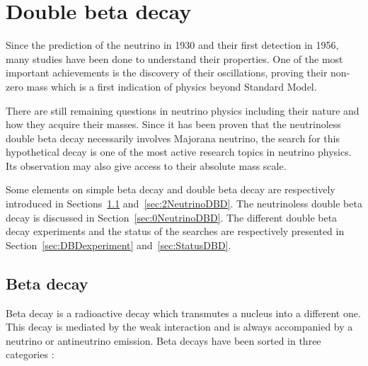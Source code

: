 \documentclass[main.tex]{subfiles}
\begin{document}
\chapter{Double beta decay}
 



\NI Since the prediction of the neutrino in 1930 and their first detection in 1956, many studies have been done to understand their properties. One of the most important achievements is the discovery of their oscillations, proving their non-zero mass which is a first indication of physics beyond Standard Model. 


\bigskip


\NI There are still remaining questions in neutrino physics including their nature and how they acquire their masses. Since it has been proven that the neutrinoless double beta decay necessarily involves Majorana neutrino, the search for this hypothetical decay is one of the most active research topics in neutrino physics. Its observation may also give access to their absolute mass scale.


\bigskip


\NI Some elements on simple beta decay and double beta decay are respectively introduced in Sections~\ref{sec:betaDecay} and~\ref{sec:2NeutrinoDBD}. The neutrinoless double beta decay is discussed in Section~\ref{sec:0NeutrinoDBD}. The different double beta decay experiments and the status of the searches are respectively presented in Section~\ref{sec:DBDexperiment} and~\ref{sec:StatusDBD}.


\section{Beta decay}\label{sec:betaDecay}


\NI Beta decay is a radioactive decay which transmutes a nucleus into a different one. This decay is mediated by the weak interaction and is always accompanied by a neutrino or antineutrino emission. Beta decays have been sorted in three categories :


\bigskip
\end{document}
